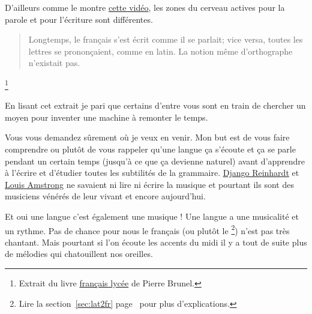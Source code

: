 \documentclass[12pt,a4paper]{book}
\newcommand{\exFR}[1]{%
  \textcolor{olive}{\textcursive{#1}}}
\begin{document}
D'ailleurs comme le montre \href{https://youtu.be/Wn\_eBrIDUuc}{cette vidéo}, les zones du cerveau actives
pour la parole et pour l'écriture sont différentes.\par

\begin{quote}
Longtemps, le français s'est écrit comme il se parlait; vice versa,
toutes les lettres se prononçaient, comme en latin. La notion même
d'orthographe n'existait pas.
\end{quote}\footnote{Extrait du livre
\href{https://www.amazon.fr/gp/product/2844100015/ref=as\_li\_tl?ie=UTF8\&camp=1642\&creative=6746\&creativeASIN=2844100015\&linkCode=as2\&tag=wwwbecomefree-21\&linkId=985f3a849fd44728e8480993cf2d5490}{français
  lycée} de Pierre Brunel.}


En lisant cet extrait je pari que certains d'entre vous sont en train
de chercher un moyen pour inventer une machine à remonter le temps. 

Vous vous demandez sûrement où je veux en venir. Mon but est de vous
faire comprendre ou plutôt de vous rappeler qu'une langue ça s'écoute
et ça se parle pendant un certain temps (jusqu'à ce que ça devienne
naturel) avant d'apprendre à l'écrire et d'étudier toutes les
subtilités de la grammaire. \href{https://fr.wikipedia.org/wiki/Django\_Reinhardt}{Django Reinhardt} et \href{https://fr.wikipedia.org/wiki/Louis\_Armstrong}{Louis Amstrong} ne
savaient ni lire ni écrire la musique et pourtant ils sont des
musiciens vénérés de leur vivant et encore aujourd'hui.\par

Et oui une langue c'est également une musique ! Une langue a une
musicalité et un rythme. Pas de chance pour nous le français (ou
plutôt le \exFR{parisien}\footnote{Lire la section~\ref{sec:lat2fr}
  page~\pageref{sec:lat2fr} pour plus d'explications.})
n'est pas très chantant. Mais pourtant si l'on écoute les accents du
midi il y a tout de suite plus de mélodies qui chatouillent nos
oreilles. 
\end{document}
